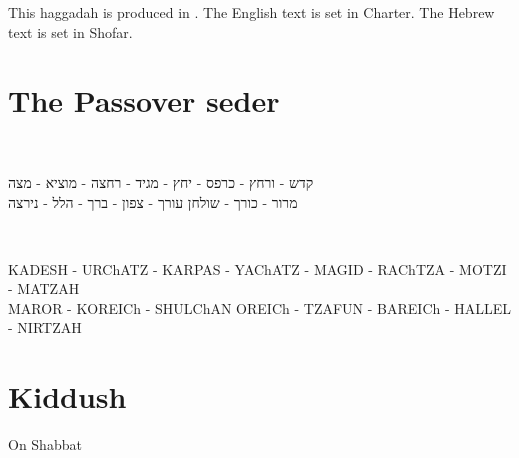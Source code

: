 \documentclass[a4paper,12pt,openany]{memoir}
\newcommand{\cH}{Ch}
\newenvironment{HgHebrew}{\begin{hebrew}\strut\\\noindent\Large}{\end{hebrew}}
\newenvironment{HgTranslit}{\strut\\\noindent\begin{itshape}}{\end{itshape}\vspace{1em}}
\begin{document}
\vfill
\noindent
This  haggadah is produced in {\XeLaTeX}. The English text is
set in Charter. The Hebrew text is set in Shofar.

\newpage

\chapter{The Passover seder}

\vfill

\vspace{-2em}
\begin{HgHebrew}
  \begin{center}
  קדש 
  -
  ורחץ
  -
  כרפס 
  -
  יחץ 
  -
  מגיד 
  -
  רחצה 
  -
  מוציא
  -
  מצה 
  \\
  מרור 
  -
  כורך 
  -
  שולחן עורך 
  -
  צפון
  -
  ברך 
  -
  הלל 
  -
  נירצה 
  \end{center}
\end{HgHebrew}
\vspace{-3em}
\begin{HgTranslit}
  \begin{center}
  {\small 
    KADESH - UR{\cH}ATZ - KARPAS - YA{\cH}ATZ - %
    MAGID - RA{\cH}TZA - MOTZI - MATZAH \\ 
    MAROR - KOREI{\cH} - SHUL{\cH}AN OREI{\cH} - %
    TZAFUN - BAREI{\cH} - HALLEL - NIRTZAH}
  \end{center}
\end{HgTranslit}


\newpage

\tableofcontents*



\chapter{Kiddush}
\setcounter{page}{1}

\noindent
On Shabbat
\end{document}
